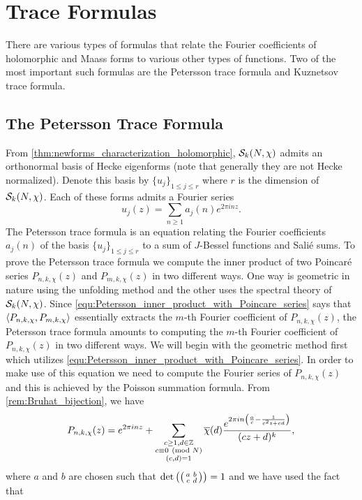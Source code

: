 \chapter{Trace Formulas}
  There are various types of formulas that relate the Fourier coefficients of holomorphic and Maass forms to various other types of functions. Two of the most important such formulas are the Petersson trace formula and Kuznetsov trace formula.
  \section{The Petersson Trace Formula}
    From \cref{thm:newforms_characterization_holomorphic}, $\mathcal{S}_{k}(N,\chi)$ admits an orthonormal basis of Hecke eigenforms (note that generally they are not Hecke normalized). Denote this basis by $\{u_{j}\}_{1 \le j \le r}$ where $r$ is the dimension of $\mathcal{S}_{k}(N,\chi)$. Each of these forms admits a Fourier series
    \[
      u_{j}(z) = \sum_{n \ge 1}a_{j}(n)e^{2\pi inz}.
    \]
    The Petersson trace formula is an equation relating the Fourier coefficients $a_{j}(n)$ of the basis $\{u_{j}\}_{1 \le j \le r}$ to a sum of $J$-Bessel functions and Sali\'e sums. To prove the Petersson trace formula we compute the inner product of two Poincar\'e series $P_{n,k,\chi}(z)$ and $P_{m,k,\chi}(z)$ in two different ways. One way is geometric in nature using the unfolding method and the other uses the spectral theory of $\mathcal{S}_{k}(N,\chi)$. Since \cref{equ:Petersson_inner_product_with_Poincare_series} says that $\langle P_{n,k,\chi},P_{m,k,\chi}\rangle$ essentially extracts the $m$-th Fourier coefficient of $P_{n,k,\chi}(z)$, the Petersson trace formula amounts to computing the $m$-th Fourier coefficient of $P_{n,k,\chi}(z)$ in two different ways. We will begin with the geometric method first which utilizes \cref{equ:Petersson_inner_product_with_Poincare_series}. In order to make use of this equation we need to compute the Fourier series of $P_{n,k,\chi}(z)$ and this is achieved by the Poisson summation formula. From \cref{rem:Bruhat_bijection}, we have
    \[
      P_{n,k,\chi}(z) = e^{2\pi inz}+\sum_{\substack{c \ge 1, d \in \mathbb{Z} \\ c \equiv 0 \ \left(\text{mod }N\right) \\ (c,d) = 1}}\overline{\chi}(d)\frac{e^{2\pi in\left(\frac{a}{c}-\frac{1}{c^{2}z+cd}\right)}}{(cz+d)^{k}},
    \]
    where $a$ and $b$ are chosen such that $\det\left(\begin{psmallmatrix} a & b \\ c & d \end{psmallmatrix}\right) = 1$ and we have used the fact that
